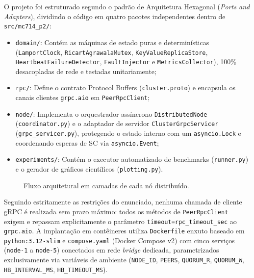 \documentclass[conference,10pt]{IEEEtran}
\begin{document}
O projeto foi estruturado segundo o padrão de Arquitetura Hexagonal (\textit{Ports and Adapters}), dividindo o código em quatro pacotes independentes dentro de \texttt{src/mc714\_p2/}:
\begin{itemize}\raggedright
    \item \texttt{domain/}: Contém as máquinas de estado puras e determinísticas (\texttt{LamportClock}, \texttt{RicartAgrawalaMutex}, \texttt{KeyValueReplicaStore}, \texttt{HeartbeatFailureDetector}, \texttt{FaultInjector} e \texttt{MetricsCollector}), 100\% desacopladas de rede e testadas unitariamente;
    \item \texttt{rpc/}: Define o contrato Protocol Buffers (\texttt{cluster.proto}) e encapsula os canais clientes \texttt{grpc.aio} em \texttt{PeerRpcClient};
    \item \texttt{node/}: Implementa o orquestrador assíncrono \texttt{DistributedNode} (\texttt{coordinator.py}) e o adaptador de servidor \texttt{ClusterGrpcServicer} (\texttt{grpc\_servicer.py}), protegendo o estado interno com um \texttt{asyncio.Lock} e coordenando esperas de SC via \texttt{asyncio.Event};
    \item \texttt{experiments/}: Contém o executor automatizado de benchmarks (\texttt{runner.py}) e o gerador de gráficos científicos (\texttt{plotting.py}).
\end{itemize}

\begin{figure}[t]
\centering
{}
\caption{Fluxo arquitetural em camadas de cada nó distribuído.}
\label{fig:arch}
\end{figure}

Seguindo estritamente as restrições do enunciado, nenhuma chamada de cliente gRPC é realizada sem prazo máximo: todos os métodos de \texttt{PeerRpcClient} exigem e repassam explicitamente o parâmetro \texttt{timeout=rpc\_timeout\_sec} ao \texttt{grpc.aio}. A implantação em contêineres utiliza \texttt{Dockerfile} enxuto baseado em \texttt{python:3.12-slim} e \texttt{compose.yaml} (Docker Compose v2) com cinco serviços (\texttt{node-1} a \texttt{node-5}) conectados em rede \textit{bridge} dedicada, parametrizados exclusivamente via variáveis de ambiente (\texttt{NODE\_ID}, \texttt{PEERS}, \texttt{QUORUM\_R}, \texttt{QUORUM\_W}, \texttt{HB\_INTERVAL\_MS}, \texttt{HB\_TIMEOUT\_MS}).
\end{document}
